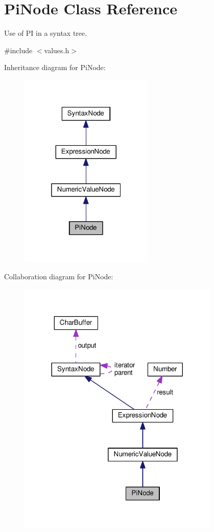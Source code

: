 \hypertarget{classPiNode}{}\section{Pi\+Node Class Reference}
\label{classPiNode}


Use of PI in a syntax tree.  




{\ttfamily \#include $<$values.\+h$>$}



Inheritance diagram for Pi\+Node\+:
\nopagebreak
\begin{figure}[H]
\begin{center}
\leavevmode
\includegraphics[width=181pt]{d6/df9/classPiNode__inherit__graph}
\end{center}
\end{figure}


Collaboration diagram for Pi\+Node\+:
\nopagebreak
\begin{figure}[H]
\begin{center}
\leavevmode
\includegraphics[width=272pt]{dc/d65/classPiNode__coll__graph}
\end{center}
\end{figure}
